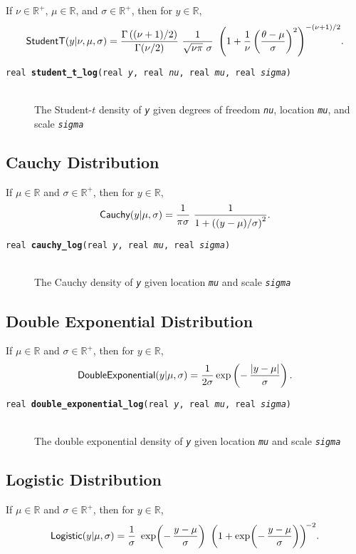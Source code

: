 \documentclass[10pt]{report}
\newcommand{\distro}[1]{\mbox{\sf #1}}
\newcommand{\reals}{\mathbb{R}}
\newcommand{\posreals}{\mathbb{R}^+}
\newcommand{\fitem}[4]{\item[{\tt #1 {\bfseries #2}(#3)}]\mbox{ } \\[4pt] #4}
\newcommand{\farg}[1]{{\tt\slshape #1}}
\begin{document}
If $\nu \in \posreals$, $\mu \in \reals$, and $\sigma \in \posreals$,
then for $y \in \reals$,
\[
\distro{StudentT}(y|\nu,\mu,\sigma)
=
\frac{\Gamma\left((\nu + 1)/2\right)}
     {\Gamma(\nu/2)}
\
\frac{1}{\sqrt{\nu \pi} \ \sigma}
\
\left(
1 + \frac{1}{\nu} \left(\frac{\theta - \mu}{\sigma}\right)^2
\right)^{-(\nu + 1)/2}
\! .
\]

\begin{description}
  \fitem{real}{student\_t\_log}{real \farg{y}, real \farg{nu}, real
    \farg{mu}, real \farg{sigma}}{The Student-$t$ density of \farg{y}
    given degrees of freedom \farg{nu}, location \farg{mu}, and scale
    \farg{sigma}}
\end{description}

\subsection{Cauchy Distribution}

If $\mu \in \reals$ and $\sigma \in \posreals$, then for $y \in \reals$,
\[
\distro{Cauchy}(y|\mu,\sigma)
= 
\frac{1}{\pi \sigma}
\
\frac{1}{1 + \left((y - \mu)/\sigma\right)^2}
.
\]

\begin{description}
%
\fitem{real}{cauchy\_log}{real \farg{y}, real \farg{mu}, real
 \farg{sigma}}{ The Cauchy density of \farg{y} given location
 \farg{mu} and scale \farg{sigma}}
%
\end{description}

\subsection{Double Exponential Distribution}

If $\mu \in \reals$ and $\sigma \in \posreals$, then for $y \in \reals$, 
\[
\distro{DoubleExponential}(y|\mu,\sigma)
= \frac{1}{2\sigma} 
  \exp \left( - \, \frac{|y - \mu|}{\sigma} \right)
.
\]

\begin{description}
\fitem{real}{double\_exponential\_log}{real \farg{y}, real \farg{mu},
real \farg{sigma}}{ The double exponential density of \farg{y} given
location \farg{mu} and scale \farg{sigma}}
\end{description}

\subsection{Logistic Distribution}

If $\mu \in \reals$ and $\sigma \in \posreals$, then for $y \in \reals$,
\[
\distro{Logistic}(y|\mu,\sigma)
=
\frac{1}{\sigma}
\
\exp\!\left( - \, \frac{y - \mu}{\sigma} \right)
\
\left(1 + \exp \!\left( - \, \frac{y - \mu}{\sigma} \right) \right)^{\!-2}
\! .
\]
\end{document}

